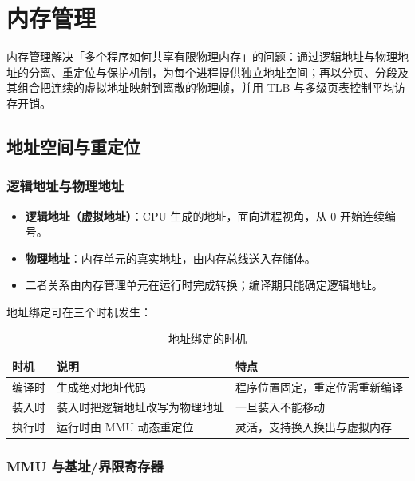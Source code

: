 \clearpage
\begingroup
\let\clearpage\relax
\let\cleardoublepage\relax
\vspace*{\fill}
\chapter{内存管理}
\begin{center}
内存管理解决「多个程序如何共享有限物理内存」的问题：通过逻辑地址与物理地址的分离、重定位与保护机制，为每个进程提供独立地址空间；再以分页、分段及其组合把连续的虚拟地址映射到离散的物理帧，并用 TLB 与多级页表控制平均访存开销。
\end{center}
\vspace*{\fill}
\endgroup
\clearpage

\section{地址空间与重定位}

\subsection{逻辑地址与物理地址}

\begin{itemize}
    \item \textbf{逻辑地址（虚拟地址）}：CPU 生成的地址，面向进程视角，从 0 开始连续编号。
    \item \textbf{物理地址}：内存单元的真实地址，由内存总线送入存储体。
    \item 二者关系由内存管理单元在运行时完成转换；编译期只能确定逻辑地址。
\end{itemize}

地址绑定可在三个时机发生：

\begin{table}[H]
\centering
\caption{地址绑定的时机}
\begin{tabulary}{\textwidth}{LLL}
\toprule
时机 & 说明 & 特点 \\
\midrule
编译时 & 生成绝对地址代码 & 程序位置固定，重定位需重新编译 \\
装入时 & 装入时把逻辑地址改写为物理地址 & 一旦装入不能移动 \\
执行时 & 运行时由 MMU 动态重定位 & 灵活，支持换入换出与虚拟内存 \\
\bottomrule
\end{tabulary}
\end{table}

\subsection{MMU 与基址/界限寄存器}

